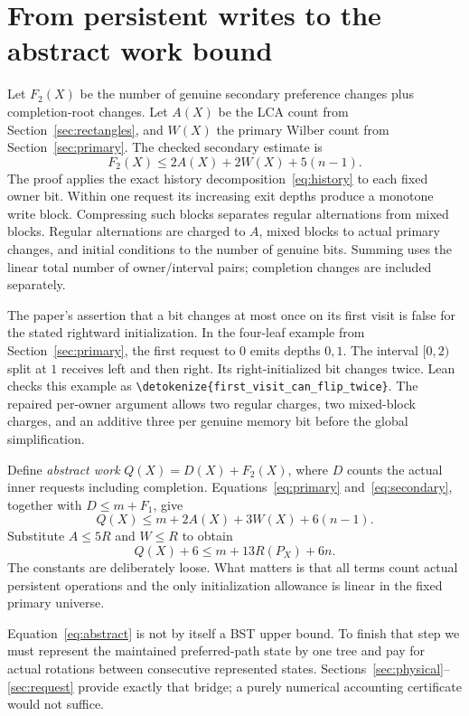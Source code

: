 \documentclass[11pt,a4paper]{article}
\newcommand{\lean}[1]{{\small\expandafter\nolinkurl\expandafter{\detokenize{#1}}}}
\begin{document}
\section{From persistent writes to the abstract work bound}\label{sec:flips}
Let $F_2(X)$ be the number of genuine secondary preference changes plus
completion-root changes. Let $A(X)$ be the LCA count from
Section~\ref{sec:rectangles}, and $W(X)$ the primary Wilber count from
Section~\ref{sec:primary}. The checked secondary estimate is
\begin{equation}\label{eq:secondary}
 F_2(X)\le2A(X)+2W(X)+5(n-1).
\end{equation}
The proof applies the exact history decomposition~\eqref{eq:history}
to each fixed owner bit. Within one request its increasing exit depths
produce a monotone write block. Compressing such blocks separates regular
alternations from mixed blocks. Regular alternations are charged to
$A$, mixed blocks to actual primary changes, and initial conditions to
the number of genuine bits. Summing uses the linear total number of
owner/interval pairs; completion changes are included separately.

The paper's assertion that a bit changes at most once on its first visit
is false for the stated rightward initialization. In the four-leaf
example from Section~\ref{sec:primary}, the first request to $0$ emits
depths $0,1$. The interval $[0,2)$ split at $1$ receives left and then
right. Its right-initialized bit changes twice. Lean checks this example
as \lean{first_visit_can_flip_twice}. The repaired per-owner argument
allows two regular charges, two mixed-block charges, and an additive
three per genuine memory bit before the global simplification.

Define \emph{abstract work} $Q(X)=D(X)+F_2(X)$, where $D$ counts the
actual inner requests including completion. Equations~\eqref{eq:primary}
and~\eqref{eq:secondary}, together with $D\le m+F_1$, give
\[
 Q(X)\le m+2A(X)+3W(X)+6(n-1).
\]
Substitute $A\le5R$ and $W\le R$ to obtain
\begin{equation}\label{eq:abstract}
 Q(X)+6\le m+13R(P_X)+6n.
\end{equation}
The constants are deliberately loose. What matters is that all terms
count actual persistent operations and the only initialization allowance
is linear in the fixed primary universe.

Equation~\eqref{eq:abstract} is not by itself a BST upper bound. To
finish that step we must represent the maintained preferred-path state
by one tree and pay for actual rotations between consecutive represented
states. Sections~\ref{sec:physical}--\ref{sec:request} provide exactly
that bridge; a purely numerical accounting certificate would not suffice.
\end{document}
